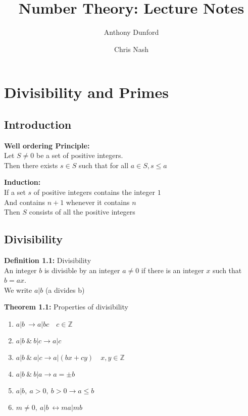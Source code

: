 \documentclass[a4paper]{article}
\title{Number Theory: Lecture Notes}
\author{Anthony Dunford \and Chris Nash}
\begin{document}
\maketitle

\tableofcontents


\section{Divisibility and Primes}

\subsection{Introduction}

\textbf{Well ordering Principle:}\\
Let $S\neq0$ be a set of positive integers.\\
Then there exists $s\in S$ such that for all $a\in S, s\leq a$

\textbf{Induction:}\\
If a set $s$ of positive integers contains the integer $1$\\
And contains $n+1$ whenever it contains $n$\\
Then $S$ consists of all the positive integers

\subsection{Divisibility}

\textbf{Definition 1.1:} Divisibility\\
An integer $b$ is divisible by an integer $a\neq0$ if there is an integer $x$ such that $b=ax$.\\
We write $a|b$ (a divides b)

\textbf{Theorem 1.1:} Properties of divisibility
\begin{enumerate}
    \item $a|b\            \rightarrow a|bc\quad c\in \mathbb{Z}$
    \item $a|b\ \&\ b|c    \rightarrow a|c$
    \item $a|b\ \&\ a|c    \rightarrow a|(bx+cy)\quad x,y\in\mathbb{Z}$
    \item $a|b\ \&\ b|a    \rightarrow a=\pm b$


    \item $a|b,\ a>0,\ b>0 \rightarrow a\leq b$
    \item $m\neq0,\ a|b\   \leftrightarrow ma|mb$
\end{enumerate}
\end{document}
